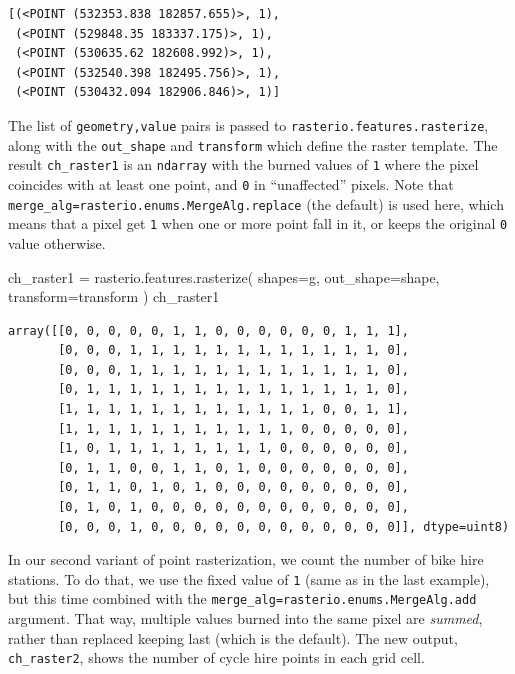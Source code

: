 \documentclass[
  letterpaper,
]{krantz}
\newenvironment{Shaded}{\begin{snugshade}}{\end{snugshade}}
\newcommand{\NormalTok}[1]{\textcolor[rgb]{0.00,0.23,0.31}{#1}}
\newcommand{\OperatorTok}[1]{\textcolor[rgb]{0.37,0.37,0.37}{#1}}
\begin{document}
\begin{verbatim}
[(<POINT (532353.838 182857.655)>, 1),
 (<POINT (529848.35 183337.175)>, 1),
 (<POINT (530635.62 182608.992)>, 1),
 (<POINT (532540.398 182495.756)>, 1),
 (<POINT (530432.094 182906.846)>, 1)]
\end{verbatim}

The list of \texttt{geometry,value} pairs is passed to
\texttt{rasterio.features.rasterize}, along with the \texttt{out\_shape}
and \texttt{transform} which define the raster template. The result
\texttt{ch\_raster1} is an \texttt{ndarray} with the burned values of
\texttt{1} where the pixel coincides with at least one point, and
\texttt{0} in ``unaffected'' pixels. Note that
\texttt{merge\_alg=rasterio.enums.MergeAlg.replace} (the default) is
used here, which means that a pixel get \texttt{1} when one or more
point fall in it, or keeps the original \texttt{0} value otherwise.

\begin{Shaded}
\begin{Highlighting}[]
\NormalTok{ch\_raster1 }\OperatorTok{=}\NormalTok{ rasterio.features.rasterize(}
\NormalTok{    shapes}\OperatorTok{=}\NormalTok{g,}
\NormalTok{    out\_shape}\OperatorTok{=}\NormalTok{shape, }
\NormalTok{    transform}\OperatorTok{=}\NormalTok{transform}
\NormalTok{)}
\NormalTok{ch\_raster1}
\end{Highlighting}
\end{Shaded}

\begin{verbatim}
array([[0, 0, 0, 0, 0, 1, 1, 0, 0, 0, 0, 0, 0, 1, 1, 1],
       [0, 0, 0, 1, 1, 1, 1, 1, 1, 1, 1, 1, 1, 1, 1, 0],
       [0, 0, 0, 1, 1, 1, 1, 1, 1, 1, 1, 1, 1, 1, 1, 0],
       [0, 1, 1, 1, 1, 1, 1, 1, 1, 1, 1, 1, 1, 1, 1, 0],
       [1, 1, 1, 1, 1, 1, 1, 1, 1, 1, 1, 1, 0, 0, 1, 1],
       [1, 1, 1, 1, 1, 1, 1, 1, 1, 1, 1, 0, 0, 0, 0, 0],
       [1, 0, 1, 1, 1, 1, 1, 1, 1, 1, 0, 0, 0, 0, 0, 0],
       [0, 1, 1, 0, 0, 1, 1, 0, 1, 0, 0, 0, 0, 0, 0, 0],
       [0, 1, 1, 0, 1, 0, 1, 0, 0, 0, 0, 0, 0, 0, 0, 0],
       [0, 1, 0, 1, 0, 0, 0, 0, 0, 0, 0, 0, 0, 0, 0, 0],
       [0, 0, 0, 1, 0, 0, 0, 0, 0, 0, 0, 0, 0, 0, 0, 0]], dtype=uint8)
\end{verbatim}

In our second variant of point rasterization, we count the number of
bike hire stations. To do that, we use the fixed value of \texttt{1}
(same as in the last example), but this time combined with the
\texttt{merge\_alg=rasterio.enums.MergeAlg.add} argument. That way,
multiple values burned into the same pixel are \emph{summed}, rather
than replaced keeping last (which is the default). The new output,
\texttt{ch\_raster2}, shows the number of cycle hire points in each grid
cell.
\end{document}
